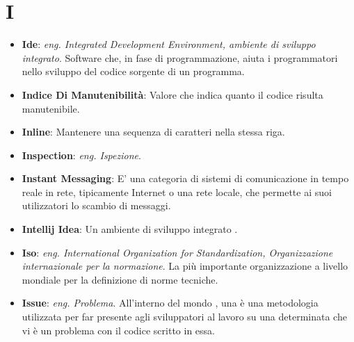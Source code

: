 \section*{I}
\begin{itemize}
	\item
	\textbf{Ide}: \textit{eng. Integrated Development Environment, ambiente di sviluppo integrato}. Software che, in fase di programmazione, aiuta i programmatori nello sviluppo del codice sorgente di un programma.
	\item
	\textbf{Indice Di Manutenibilità}: Valore che indica quanto il codice risulta manutenibile.
	\item
	\textbf{Inline}: Mantenere una sequenza di caratteri nella stessa riga.
	\item
	\textbf{Inspection}: \textit{eng. Ispezione}.
	\item
	\textbf{Instant Messaging}: E' una categoria di sistemi di comunicazione in tempo reale in rete, tipicamente Internet o una rete locale, che permette ai suoi utilizzatori lo scambio di messaggi.
	\item
	\textbf{Intellij Idea}: Un ambiente di sviluppo integrato .
	\item
	\textbf{Iso}: \textit{eng. International Organization for Standardization, Organizzazione internazionale per la normazione}. La più importante organizzazione a livello mondiale per la definizione di norme tecniche.
	\item
	\textbf{Issue}: \textit{eng. Problema}. All'interno del mondo , una  è una metodologia utilizzata per far presente agli sviluppatori al lavoro su una determinata  che vi è un problema con il codice scritto in essa.
\end{itemize}
\newpage